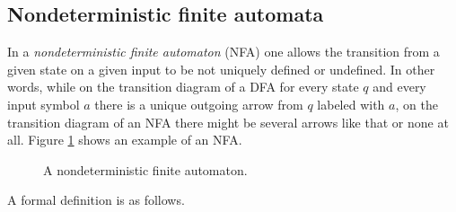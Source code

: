 \subsection{Nondeterministic finite automata}
In a \emph{nondeterministic finite automaton} (NFA) one allows the transition from a given state on a given input to be not uniquely defined or undefined.
In other words, while on the transition diagram of a DFA for every state $q$ and every input symbol $a$ there is a unique outgoing arrow from $q$ labeled with $a$,
on the transition diagram of an NFA there might be several arrows like that or none at all.
Figure \ref{fig:NFA} shows an example of an NFA.

\begin{figure}[htb]
\begin{center}

\end{center}
\caption{A nondeterministic finite automaton.}
\label{fig:NFA}
\end{figure}

A formal definition is as follows.